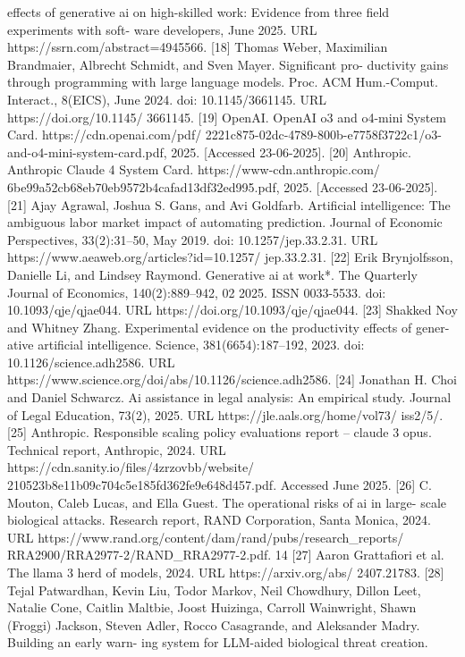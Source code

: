 effects of generative ai on high-skilled work: Evidence from three field experiments with soft-
ware developers, June 2025. URL https://ssrn.com/abstract=4945566.
[18] Thomas Weber, Maximilian Brandmaier, Albrecht Schmidt, and Sven Mayer. Significant pro-
ductivity gains through programming with large language models. Proc. ACM Hum.-Comput.
Interact., 8(EICS), June 2024. doi: 10.1145/3661145. URL https://doi.org/10.1145/
3661145.
[19] OpenAI.
OpenAI o3 and o4-mini System Card.
https://cdn.openai.com/pdf/
2221c875-02dc-4789-800b-e7758f3722c1/o3-and-o4-mini-system-card.pdf,
2025. [Accessed 23-06-2025].
[20] Anthropic.
Anthropic Claude 4 System Card.
https://www-cdn.anthropic.com/
6be99a52cb68eb70eb9572b4cafad13df32ed995.pdf, 2025. [Accessed 23-06-2025].
[21] Ajay Agrawal, Joshua S. Gans, and Avi Goldfarb. Artificial intelligence: The ambiguous labor
market impact of automating prediction. Journal of Economic Perspectives, 33(2):31–50, May
2019. doi: 10.1257/jep.33.2.31. URL https://www.aeaweb.org/articles?id=10.1257/
jep.33.2.31.
[22] Erik Brynjolfsson, Danielle Li, and Lindsey Raymond. Generative ai at work*. The Quarterly
Journal of Economics, 140(2):889–942, 02 2025. ISSN 0033-5533. doi: 10.1093/qje/qjae044.
URL https://doi.org/10.1093/qje/qjae044.
[23] Shakked Noy and Whitney Zhang. Experimental evidence on the productivity effects of gener-
ative artificial intelligence. Science, 381(6654):187–192, 2023. doi: 10.1126/science.adh2586.
URL https://www.science.org/doi/abs/10.1126/science.adh2586.
[24] Jonathan H. Choi and Daniel Schwarcz. Ai assistance in legal analysis: An empirical study.
Journal of Legal Education, 73(2), 2025.
URL https://jle.aals.org/home/vol73/
iss2/5/.
[25] Anthropic.
Responsible scaling policy evaluations report – claude 3 opus.
Technical
report, Anthropic, 2024.
URL https://cdn.sanity.io/files/4zrzovbb/website/
210523b8e11b09c704c5e185fd362fe9e648d457.pdf. Accessed June 2025.
[26] C. Mouton, Caleb Lucas, and Ella Guest.
The operational risks of ai in large-
scale
biological
attacks.
Research
report,
RAND
Corporation,
Santa
Monica,
2024.
URL https://www.rand.org/content/dam/rand/pubs/research\_reports/
RRA2900/RRA2977-2/RAND\_RRA2977-2.pdf.
14
[27] Aaron Grattafiori et al. The llama 3 herd of models, 2024. URL https://arxiv.org/abs/
2407.21783.
[28] Tejal Patwardhan, Kevin Liu, Todor Markov, Neil Chowdhury, Dillon Leet, Natalie
Cone, Caitlin Maltbie, Joost Huizinga, Carroll Wainwright, Shawn (Froggi) Jackson,
Steven Adler, Rocco Casagrande, and Aleksander Madry.
Building an early warn-
ing system for LLM-aided biological threat creation.
